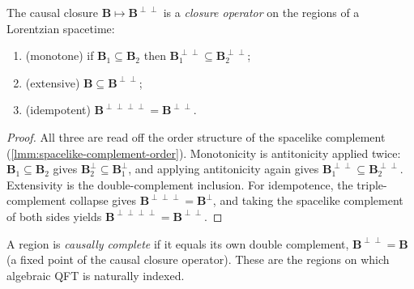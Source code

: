 \begin{lemma}
    \label{lmm:causal-closure-is-closure-operator}
    The causal closure $\mathbf{B} \mapsto \mathbf{B}^{\perp\perp}$ is a \emph{closure operator} on the regions of a Lorentzian spacetime:
    \begin{enumerate}
        \item (monotone) if $\mathbf{B}_1 \subseteq \mathbf{B}_2$ then $\mathbf{B}_1^{\perp\perp} \subseteq \mathbf{B}_2^{\perp\perp}$;
        \item (extensive) $\mathbf{B} \subseteq \mathbf{B}^{\perp\perp}$;
        \item (idempotent) $\mathbf{B}^{\perp\perp\perp\perp} = \mathbf{B}^{\perp\perp}$.
    \end{enumerate}
\end{lemma}
\begin{proof}
    All three are read off the order structure of the spacelike complement (\ref{lmm:spacelike-complement-order}). Monotonicity is antitonicity applied twice: $\mathbf{B}_1 \subseteq \mathbf{B}_2$ gives $\mathbf{B}_2^{\perp} \subseteq \mathbf{B}_1^{\perp}$, and applying antitonicity again gives $\mathbf{B}_1^{\perp\perp} \subseteq \mathbf{B}_2^{\perp\perp}$. Extensivity is the double-complement inclusion. For idempotence, the triple-complement collapse gives $\mathbf{B}^{\perp\perp\perp} = \mathbf{B}^{\perp}$, and taking the spacelike complement of both sides yields $\mathbf{B}^{\perp\perp\perp\perp} = \mathbf{B}^{\perp\perp}$.
\end{proof}

\begin{definition}
    \label{def:causally-complete-region}
    \leanok
    A region is \emph{causally complete} if it equals its own double complement, $\mathbf{B}^{\perp\perp} = \mathbf{B}$ (a fixed point of the causal closure operator). These are the regions on which algebraic QFT is naturally indexed.
\end{definition}

